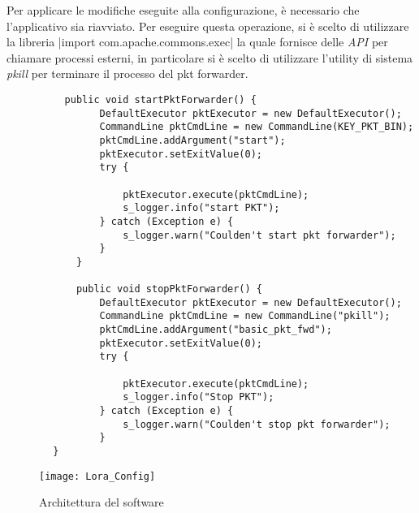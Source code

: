 Per applicare le modifiche eseguite alla configurazione, è necessario che
l'applicativo sia riavviato. Per eseguire questa operazione, si è scelto di
utilizzare la libreria 
|import com.apache.commons.exec|
la quale fornisce delle \emph{API} per chiamare processi esterni, in particolare
si è scelto di utilizzare l'utility di sistema \emph{pkill} per terminare il
processo del pkt forwarder.
\begin{verbatim}
          public void startPktForwarder() {
                DefaultExecutor pktExecutor = new DefaultExecutor();
                CommandLine pktCmdLine = new CommandLine(KEY_PKT_BIN);
                pktCmdLine.addArgument("start");
                pktExecutor.setExitValue(0);
                try {

                    pktExecutor.execute(pktCmdLine);
                    s_logger.info("start PKT");
                } catch (Exception e) {
                    s_logger.warn("Coulden't start pkt forwarder");
                }
            }

            public void stopPktForwarder() {
                DefaultExecutor pktExecutor = new DefaultExecutor();
                CommandLine pktCmdLine = new CommandLine("pkill");
                pktCmdLine.addArgument("basic_pkt_fwd");
                pktExecutor.setExitValue(0);
                try {

                    pktExecutor.execute(pktCmdLine);
                    s_logger.info("Stop PKT");
                } catch (Exception e) {
                    s_logger.warn("Coulden't stop pkt forwarder");
                }
        }

\end{verbatim}

\begin{figure}[h]
\centering 
\texttt{[image: Lora\_Config]}
\caption{Architettura del software}
\label{fig:Software_stack}
\end{figure}



